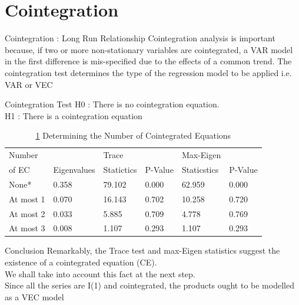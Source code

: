 \documentclass{beamer}
\begin{document}
	\section{Cointegration}
	\begin{frame}{Cointegration : Long Run Relationship}
		Cointegration analysis is important because, if two or more non-stationary variables are cointegrated, a VAR model in the first difference is mis-specified due to the effects of a common trend. The cointegration test determines the type of the regression model to be applied i.e. VAR or VEC
		
		\begin{block}{ Cointegration Test}
			H0 : There is no cointegration equation. \\
			H1 : There is a cointegration equation 
		\end{block}
		
	\end{frame}
	
	\begin{frame}
		
		\begin{table}[]
			\caption{ \ref{table:cointegration} Determining the Number of Cointegrated Equations}
			\label{table:cointegration}
			\begin{tabular}{llllll}
				\toprule
				Number & & Trace &  & Max-Eigen  & \\
				of EC & Eigenvalues & Statictics & P-Value & Staticstics & P-Value \\
				\midrule
				
			   None*     & 0.358 & 79.102 & 0.000 & 62.959 & 0.000 \\ [5pt]	
			   At most 1 & 0.070 & 16.143 & 0.702 & 10.258 & 0.720 \\ [5pt]
			   At most 2 & 0.033 & 5.885  & 0.709 & 4.778  & 0.769 \\ [5pt]
			   At most 3 & 0.008 & 1.107  & 0.293 & 1.107  & 0.293 \\ [5pt]
				\bottomrule
			\end{tabular}
		\end{table}
	
		\begin{exampleblock}{Conclusion}
			Remarkably, the Trace test and max-Eigen statistics suggest the existence of a cointegrated equation (CE). \\ 
			We shall take into account this fact at the next step. \\
			Since all the series are I(1) and cointegrated, the products ought to be modelled as a VEC model 
		\end{exampleblock}
	\end{frame}
\end{document}
